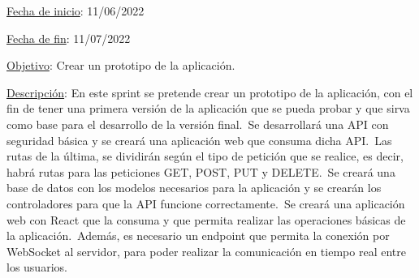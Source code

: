 
\underline{Fecha de inicio}: 11/06/2022

\underline{Fecha de fin}: 11/07/2022

\underline{Objetivo}:
Crear un prototipo de la aplicación.

\underline{Descripción}:
En este sprint se pretende crear un prototipo de la aplicación, con el fin de tener una primera versión de la
aplicación que se pueda probar y que sirva como base para el desarrollo de la versión final.\ Se desarrollará
una API con seguridad básica y se creará una aplicación web que consuma dicha API\@.\ Las rutas de la última\@,
se dividirán según el tipo de petición que se realice, es decir, habrá rutas para las peticiones GET, POST, PUT y
DELETE\@.\ Se creará una base de datos con los modelos necesarios para la aplicación y se crearán los controladores
para que la API funcione correctamente.\ Se creará una aplicación web con React que la consuma y que
permita realizar las operaciones básicas de la aplicación.\ Además, es necesario un endpoint que permita
la conexión por WebSocket al servidor, para poder realizar la comunicación en tiempo real entre los usuarios.


